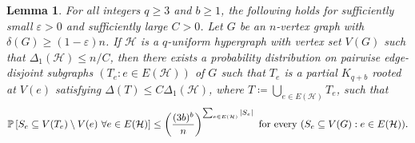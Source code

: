 \documentclass[11pt]{article}
\numberwithin{equation}{section}
\newcommand{\eps}{\varepsilon}
\newcounter{i}
\theoremstyle{plain}
\newtheorem{lem}[thm]{Lemma}
\theoremstyle{plain} %
\theoremstyle{definition}
\newcommand{\cH}{\mathcal{H}}
\newcommand{\Prob}[1]{\ensuremath{%
\mathbb P\left[#1\right]
}}
\begin{document}
\begin{lem}\label{lemma:spread-clique-embedding}
    For all integers $q \geq 3$ and $b \geq 1$, the following holds for sufficiently small $\eps> 0$ and sufficiently large $C > 0$.
    Let $G$ be an $n$-vertex graph with $\delta(G) \geq (1-\varepsilon)n$.
    If $\cH$ is a $q$-uniform hypergraph with vertex set $V(G)$ such that $\Delta_1(\cH) \leq n / C$, then there exists a probability distribution on pairwise edge-disjoint subgraphs $(T_e : e \in E(\cH))$ of $G$ such that $T_e$ is a partial $K_{q+b}$ rooted at $V(e)$ satisfying $\Delta(T) \leq C\Delta_1(\cH)$, where $T \coloneqq \bigcup_{e \in E(\cH)}T_e$, such that
    \begin{equation*}
        \Prob{S_e \subseteq V(T_e)\setminus V(e)~\forall e \in E(\cH)} \leq \left(\frac{(3b)^b}{n}\right)^{\sum_{e\in E(\cH)}|S_e|} \text{ for every } (S_e \subseteq V(G) : e \in E(\cH)). 
    \end{equation*}
\end{lem}
\end{document}
